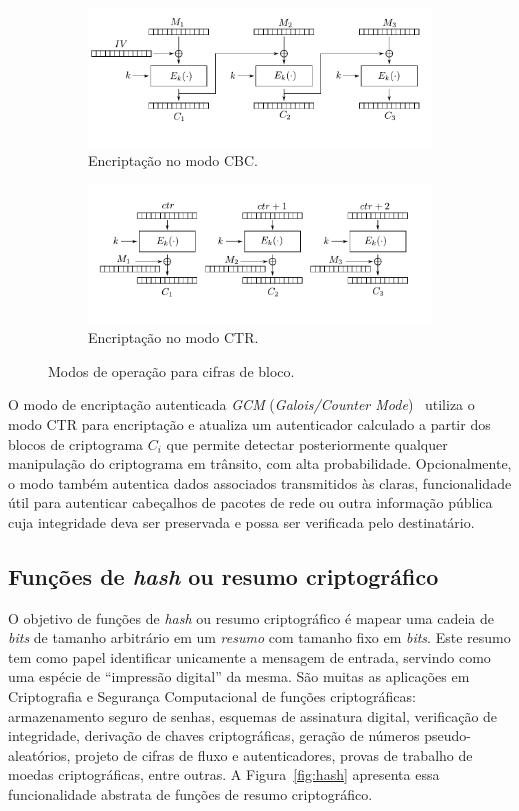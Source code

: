 \begin{figure}[htbp]
\centering
\begin{subfigure}{\textwidth}
  \centering
  \includegraphics[width=.75\linewidth]{figures/cbc.pdf}
  \caption{Encriptação no modo CBC.}
  \label{fig:cbc}
\end{subfigure}
\begin{subfigure}{\textwidth}
  \centering
  \includegraphics[width=.75\linewidth]{figures/ctr.pdf}
  \caption{Encriptação no modo CTR.}
  \label{fig:ctr}
\end{subfigure}
\caption{Modos de operação para cifras de bloco.}
\label{fig:modos}
\end{figure}

O modo de encriptação autenticada \emph{GCM} (\emph{Galois/Counter Mode})~\cite{McGrewV04} utiliza o modo CTR para encriptação e atualiza um autenticador calculado a partir dos blocos de criptograma $C_i$ que permite detectar posteriormente qualquer manipulação do criptograma em trânsito, com alta probabilidade. Opcionalmente, o modo também autentica dados associados transmitidos às claras, funcionalidade útil para autenticar cabeçalhos de pacotes de rede ou outra informação pública cuja integridade deva ser preservada e possa ser verificada pelo destinatário.

\subsection{Funções de \emph{hash} ou resumo criptográfico}

O objetivo de funções de \emph{hash} ou resumo criptográfico é mapear uma cadeia de \emph{bits} de tamanho arbitrário em um \emph{resumo} com tamanho fixo em \emph{bits}. Este resumo tem como papel identificar unicamente a mensagem de entrada, servindo como uma espécie de ``impressão digital'' da mesma. São muitas as aplicações em Criptografia e Segurança Computacional de funções criptográficas: armazenamento seguro de senhas, esquemas de assinatura digital, verificação de integridade, derivação de chaves criptográficas, geração de números pseudo-aleatórios, projeto de cifras de fluxo e autenticadores, provas de trabalho de moedas criptográficas, entre outras. A Figura~\ref{fig:hash} apresenta essa funcionalidade abstrata de funções de resumo criptográfico.

